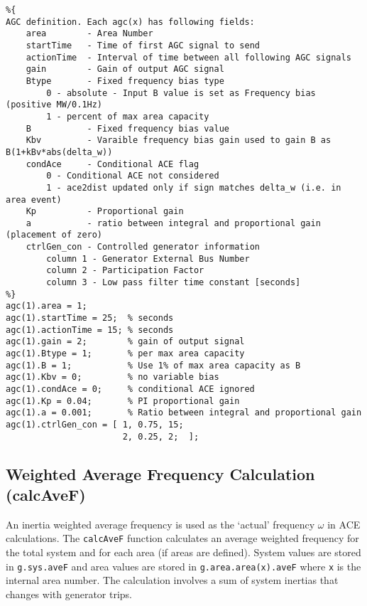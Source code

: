 \begin{lstlisting}[caption={AGC Definition Example},label={lst: agc def}]
\end{lstlisting}\vspace{-2 em}
\begin{verbatim}
%{  
AGC definition. Each agc(x) has following fields:
    area        - Area Number 
    startTime   - Time of first AGC signal to send
    actionTime  - Interval of time between all following AGC signals
    gain        - Gain of output AGC signal
    Btype       - Fixed frequency bias type
        0 - absolute - Input B value is set as Frequency bias (positive MW/0.1Hz)
        1 - percent of max area capacity
    B           - Fixed frequency bias value
    Kbv         - Varaible frequency bias gain used to gain B as B(1+kBv*abs(delta_w))
    condAce     - Conditional ACE flag
        0 - Conditional ACE not considered
        1 - ace2dist updated only if sign matches delta_w (i.e. in area event)
    Kp          - Proportional gain
    a           - ratio between integral and proportional gain (placement of zero)
    ctrlGen_con - Controlled generator information
        column 1 - Generator External Bus Number
        column 2 - Participation Factor
        column 3 - Low pass filter time constant [seconds]
%}
agc(1).area = 1;
agc(1).startTime = 25;  % seconds
agc(1).actionTime = 15; % seconds
agc(1).gain = 2;        % gain of output signal
agc(1).Btype = 1;       % per max area capacity
agc(1).B = 1;           % Use 1% of max area capacity as B
agc(1).Kbv = 0;         % no variable bias
agc(1).condAce = 0;     % conditional ACE ignored
agc(1).Kp = 0.04;       % PI proportional gain
agc(1).a = 0.001;       % Ratio between integral and proportional gain
agc(1).ctrlGen_con = [ 1, 0.75, 15;
                       2, 0.25, 2;  ];
\end{verbatim}




\subsection{Weighted Average Frequency Calculation (calcAveF)} 
An inertia weighted average frequency is used as the `actual' frequency $\omega$ in ACE calculations.
The \verb|calcAveF| function calculates an average weighted frequency for the total system and for each area (if areas are defined).
System values are stored in \verb|g.sys.aveF| and area values are stored in \verb|g.area.area(x).aveF| where \verb|x| is the internal area number.
The calculation involves a sum of system inertias that changes with generator trips.


